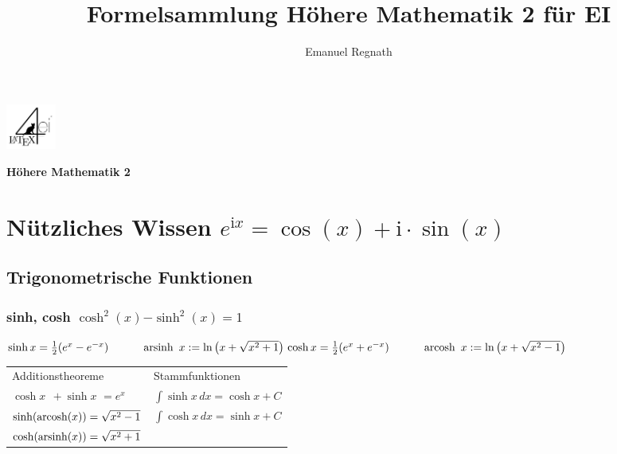 \documentclass[6pt,a4paper]{scrartcl}
\title{Formelsammlung Höhere Mathematik 2 für EI}
\author{Emanuel Regnath}
\renewcommand{\emph}[1]{\textbf{#1}}															%
\newcommand{\bs}[1]{\ensuremath{\boldsymbol{#1}}}								%
\renewcommand{\i}{\ensuremath{\mathrm{i}}}										%
\begin{document}
\begin{multicols}{4}
	\parbox{2.3cm}{
		\includegraphics[height=1.5cm]{./img/Logo.pdf}
	}
	\parbox{4cm}{
		\emph{\Large{Höhere Mathematik 2}}
	}
\vspace{-2mm} %

\section{Nützliches Wissen $e^{\i x} = \cos (x) + \i \cdot \sin(x)$}
\subsection{Trigonometrische Funktionen}
\subsubsection{sinh, cosh \quad $\cosh^2(x)  \bs - \sinh^2(x) = 1$}
$\sinh x = \frac{1}{2}(e^x -e^{-x}) \qquad \quad \operatorname{arsinh}\ x:= \ln\left(x+\sqrt{x^2+1}\right) \\
\cosh x  = \frac{1}{2}(e^x +e^{-x}) \qquad \quad \operatorname{arcosh}\ x:= \ln\left(x+\sqrt{x^2-1}\right)\\
$\\
\begin{tabular}{ll}
	Additionstheoreme &	Stammfunktionen \\
	$\cosh x \,\; + \sinh x \,\,= e^{x}$ & $\int \sinh x \, dx = \cosh x + C$\\
	$\sinh({\rm arcosh}(x)) = \sqrt{x^2 - 1}$ & $\int \cosh x \, dx = \sinh x + C $\\
	$\cosh({\rm arsinh}(x)) = \sqrt{x^2 + 1}$ \\
\end{tabular}


\end{multicols}
\end{document}
